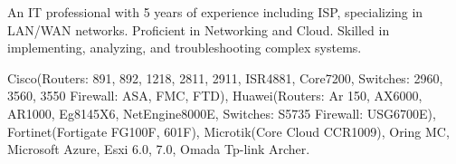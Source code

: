 \documentclass[9pt]{developercv} %
\begin{document}
\begin{minipage}[t]{0.46\textwidth}
	\vspace{-6pt}
 

	An IT professional with 5 years of experience including ISP, specializing in LAN/WAN networks. Proficient in Networking and Cloud. Skilled in implementing, analyzing, and troubleshooting complex systems.
\end{minipage}
\hfill %
\begin{minipage}[t]{0.465\textwidth}
	\vspace{-6pt}
 

	Cisco(Routers: 891, 892, 1218, 2811, 2911, ISR4881, Core7200,  Switches: 2960, 3560, 3550 Firewall: ASA, FMC, FTD), Huawei(Routers: Ar 150, AX6000, AR1000, Eg8145X6, NetEngine8000E, Switches: S5735 Firewall: USG6700E), Fortinet(Fortigate FG100F, 601F), Microtik(Core Cloud CCR1009), Oring MC, Microsoft Azure, Esxi 6.0, 7.0, Omada Tp-link Archer.
\end{minipage}
\hfill %
\end{document}
